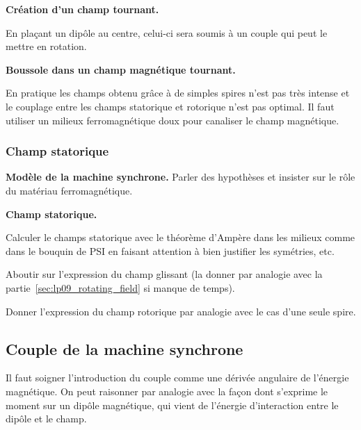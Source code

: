 \begin{slide}
\textbf{Création d'un champ tournant.}
\end{slide}

En plaçant un dipôle au centre, celui-ci sera soumis à un couple qui peut le mettre en rotation.

\begin{experience}
\textbf{Boussole dans un champ magnétique tournant.}
\end{experience}

\begin{transition}
En pratique les champs obtenu grâce à de simples spires n'est pas très intense et le couplage entre les champs statorique et rotorique n'est pas optimal.
Il faut utiliser un milieux ferromagnétique doux pour canaliser le champ magnétique.
\end{transition}

\subsubsection{Champ statorique}

\begin{slide}
\textbf{Modèle de la machine synchrone.}
Parler des hypothèses et insister sur le rôle du matériau ferromagnétique.
\end{slide}

\begin{slide}
\textbf{Champ statorique.}
\end{slide}

Calculer le champs statorique avec le théorème d'Ampère dans les milieux comme dans le bouquin de PSI en faisant attention à bien justifier les symétries, etc.

Aboutir sur l'expression du champ glissant (la donner par analogie avec la partie~\ref{sec:lp09_rotating_field} si manque de temps).

Donner l'expression du champ rotorique par analogie avec le cas d'une seule spire.

\subsection{Couple de la machine synchrone}

\begin{remarque}
Il faut soigner l'introduction du couple comme une dérivée angulaire de l'énergie magnétique.
On peut raisonner par analogie avec la façon dont s'exprime le moment sur un dipôle magnétique, qui vient de l'énergie d'interaction entre le dipôle et le champ. 
\end{remarque}

